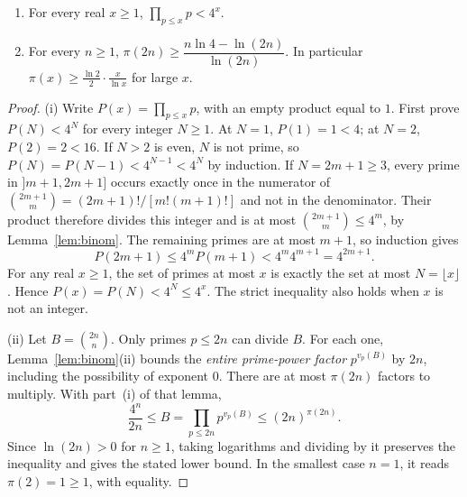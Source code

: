 \begin{theorem}\label{thm:cheb}
\begin{enumerate}[label=(\roman*)]
\item For every real $x\ge1$, $\displaystyle\prod_{p\le x}p<4^x$.
\item For every $n\ge1$, $\pi(2n)\ge\dfrac{n\ln4-\ln(2n)}{\ln(2n)}$. In particular $\pi(x)\ge\frac{\ln2}2\cdot\frac x{\ln x}$ for large $x$.
\end{enumerate}
\end{theorem}
\begin{proof}
(i) Write $P(x)=\prod_{p\le x}p$, with an empty product equal to $1$. First prove $P(N)<4^N$ for every integer $N\ge1$. At $N=1$, $P(1)=1<4$; at $N=2$, $P(2)=2<16$. If $N>2$ is even, $N$ is not prime, so $P(N)=P(N-1)<4^{N-1}<4^N$ by induction. If $N=2m+1\ge3$, every prime in $]m+1,2m+1]$ occurs exactly once in the numerator of
$\binom{2m+1}m=(2m+1)!/[m!(m+1)!]$ and not in the denominator. Their product therefore divides this integer and is at most $\binom{2m+1}m\le4^m$, by Lemma~\ref{lem:binom}. The remaining primes are at most $m+1$, so induction gives
\[
P(2m+1)\le4^mP(m+1)<4^m4^{m+1}=4^{2m+1}.
\]
For any real $x\ge1$, the set of primes at most $x$ is exactly the set at most $N=\lfloor x\rfloor$. Hence $P(x)=P(N)<4^N\le4^x$. The strict inequality also holds when $x$ is not an integer.

(ii) Let $B=\binom{2n}n$. Only primes $p\le2n$ can divide $B$. For each one, Lemma~\ref{lem:binom}(ii) bounds the \emph{entire prime-power factor} $p^{v_p(B)}$ by $2n$, including the possibility of exponent $0$. There are at most $\pi(2n)$ factors to multiply. With part~(i) of that lemma,
\[
\frac{4^n}{2n}\le B=\prod_{p\le2n}p^{v_p(B)}\le(2n)^{\pi(2n)}.
\]
Since $\ln(2n)>0$ for $n\ge1$, taking logarithms and dividing by it preserves the inequality and gives the stated lower bound. In the smallest case $n=1$, it reads $\pi(2)=1\ge1$, with equality.


\end{proof}
